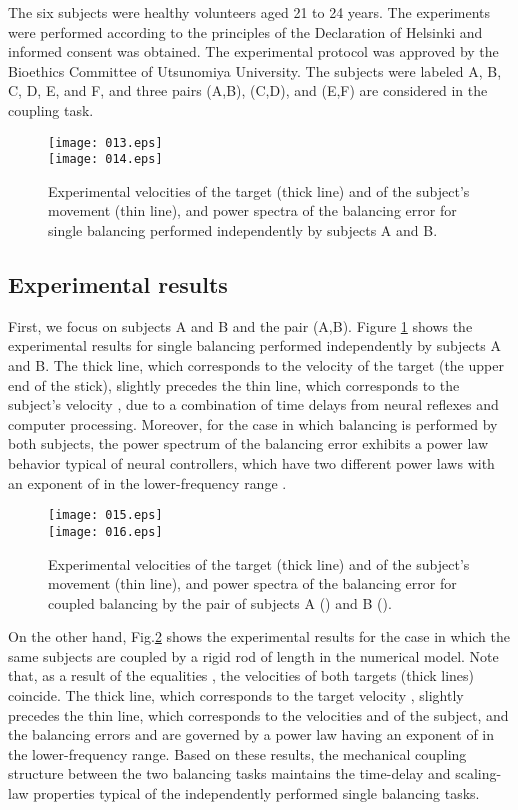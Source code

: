 \documentclass[12pt,a4paper]{ijicic}
\def\lfig#1{\label{fig:#1}}\def\rfig#1{Fig.\ref{fig:#1}}
\def\Rfig#1{Figure \ref{fig:#1}}
\begin{document}
The six subjects were healthy volunteers aged 21 to 24 years. The
experiments were performed according to the principles of the
Declaration of Helsinki and informed consent was obtained. The
experimental protocol was approved by the Bioethics Committee of
Utsunomiya University. The subjects were labeled A, B, C, D, E, and F,
and three pairs (A,B), (C,D), and (E,F) are considered in the coupling
task.

\begin{figure}[t]
  \centering\par
  \texttt{[image: 013.eps]}\\
  \texttt{[image: 014.eps]}
\caption{Experimental velocities of the target  (thick line)
  and of the subject's movement  (thin line), and power
  spectra of the balancing error  for single balancing
  performed independently by subjects A and B.}
\lfig{move_s}
\end{figure}

\subsection{Experimental results}

First, we focus on subjects A and B and the pair (A,B).  \Rfig{move_s}
shows the experimental results for single balancing performed
independently by subjects A and B.  The thick line, which corresponds to
the velocity  of the target (the upper end of the stick),
slightly precedes the thin line, which corresponds to the subject's
velocity , due to a combination of time delays from neural
reflexes and computer processing.  Moreover, for the case in which
balancing is performed by both subjects, the power spectrum 
of the balancing error  exhibits a power law behavior typical of
neural controllers, which have two different power laws with an exponent
of  in the lower-frequency range \cite{Cabrera02}.

\begin{figure}[t]
  \centering\par
  \texttt{[image: 015.eps]}\\
  \texttt{[image: 016.eps]}
\caption{Experimental velocities of the target  (thick
  line) and of the subject's movement  (thin line), and
  power spectra of the balancing error  for coupled
  balancing by the pair of subjects A () and B ().}
\lfig{move_c}
\end{figure}

On the other hand, \rfig{move_c} shows the experimental results for the
case in which the same subjects are coupled by a rigid rod of length 
in the numerical model. Note that, as a result of the equalities
, the velocities of both targets (thick lines) coincide.  The
thick line, which corresponds to the target velocity ,
slightly precedes the thin line, which corresponds to the velocities
 and  of the subject, and the balancing errors
 and  are governed by a power law having an exponent of
 in the lower-frequency range.  Based on these results,
the mechanical coupling structure between the two balancing tasks
maintains the time-delay and scaling-law properties typical of the
independently performed single balancing tasks.
\end{document}
